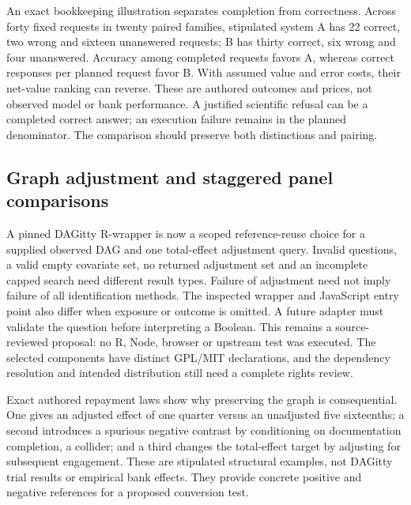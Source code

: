 An exact bookkeeping illustration separates completion from correctness.
Across forty fixed requests in twenty paired families, stipulated system
A has 22 correct, two wrong and sixteen unanswered requests; B has
thirty correct, six wrong and four unanswered. Accuracy among completed
requests favors A, whereas correct responses per planned request favor
B. With assumed value and error costs, their net-value ranking can
reverse. These are authored outcomes and prices, not observed model or
bank performance. A justified scientific refusal can be a completed
correct answer; an execution failure remains in the planned denominator.
The comparison should preserve both distinctions and pairing.
\citep{exec18_framework_reference,sp18f_framework_review}

\hypertarget{graph-adjustment-and-staggered-panel-comparisons}{%
\subsection{Graph adjustment and staggered panel
comparisons}\label{graph-adjustment-and-staggered-panel-comparisons}}

A pinned DAGitty R-wrapper is now a scoped reference-reuse choice for a
supplied observed DAG and one total-effect adjustment query. Invalid
questions, a valid empty covariate set, no returned adjustment set and
an incomplete capped search need different result types. Failure of
adjustment need not imply failure of all identification methods. The
inspected wrapper and JavaScript entry point also differ when exposure
or outcome is omitted. A future adapter must validate the question
before interpreting a Boolean. This remains a source-reviewed proposal:
no R, Node, browser or upstream test was executed. The selected
components have distinct GPL/MIT declarations, and the dependency
resolution and intended distribution still need a complete rights
review. \citep{exec18_gp_dagitty}

Exact authored repayment laws show why preserving the graph is
consequential. One gives an adjusted effect of one quarter versus an
unadjusted five sixteenths; a second introduces a spurious negative
contrast by conditioning on documentation completion, a collider; and a
third changes the total-effect target by adjusting for subsequent
engagement. These are stipulated structural examples, not DAGitty trial
results or empirical bank effects. They provide concrete positive and
negative references for a proposed conversion test.
\citep{exec18_gp_graph_reference}

